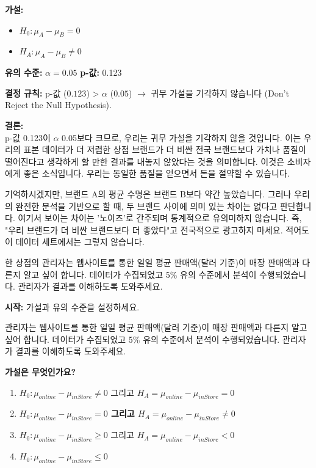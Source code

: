 \documentclass[11pt,a4paper]{article}
\begin{document}
\begin{tcolorbox}[mybox, title=두 브랜드 비교 (8/8): 4단계 - 귀무 가설 기각 여부 결정]
\textbf{가설:}
\begin{itemize}
    \item $H_0 : \mu_A - \mu_B = 0$
    \item $H_A : \mu_A - \mu_B \neq 0$
\end{itemize}
\textbf{유의 수준:} $\alpha = 0.05$
\textbf{p-값:} 0.123

\textbf{결정 규칙:}
p-값 ($0.123$) > $\alpha$ ($0.05$) $\rightarrow$ 귀무 가설을 기각하지 않습니다 (Don't Reject the Null Hypothesis).

\textbf{결론:} \\
p-값 0.123이 $\alpha$ 0.05보다 크므로, 우리는 귀무 가설을 기각하지 않을 것입니다.
이는 우리의 표본 데이터가 더 저렴한 상점 브랜드가 더 비싼 전국 브랜드보다 가치나 품질이 떨어진다고 생각하게 할 만한 결과를 내놓지 않았다는 것을 의미합니다. 이것은 소비자에게 좋은 소식입니다. 우리는 동일한 품질을 얻으면서 돈을 절약할 수 있습니다.

기억하시겠지만, 브랜드 A의 평균 수명은 브랜드 B보다 약간 높았습니다. 그러나 우리의 완전한 분석을 기반으로 할 때, 두 브랜드 사이에 의미 있는 차이는 없다고 판단합니다. 여기서 보이는 차이는 '노이즈'로 간주되며 통계적으로 유의미하지 않습니다. 즉, "우리 브랜드가 더 비싼 브랜드보다 더 좋았다"고 전국적으로 광고하지 마세요. 적어도 이 데이터 세트에서는 그렇지 않습니다.
\end{tcolorbox}

\begin{examplebox}[title=연습 문제: 온라인 vs. 매장 판매 - 문제 상황]
한 상점의 관리자는 웹사이트를 통한 일일 평균 판매액(달러 기준)이 매장 판매액과 다른지 알고 싶어 합니다. 데이터가 수집되었고 5\% 유의 수준에서 분석이 수행되었습니다. 관리자가 결과를 이해하도록 도와주세요.

\textbf{시작:} 가설과 유의 수준을 설정하세요.
\end{examplebox}

\begin{tcolorbox}[mybox, title=연습 문제: 가설은 무엇인가요? (선택)]
관리자는 웹사이트를 통한 일일 평균 판매액(달러 기준)이 매장 판매액과 다른지 알고 싶어 합니다. 데이터가 수집되었고 5\% 유의 수준에서 분석이 수행되었습니다. 관리자가 결과를 이해하도록 도와주세요.

\textbf{가설은 무엇인가요?}
\begin{enumerate}
    \item $H_0 : \mu_{online} - \mu_{inStore} \neq 0$ 그리고 $H_A = \mu_{online} - \mu_{inStore} = 0$
    \item \textbf{$H_0 : \mu_{online} - \mu_{inStore} = 0$ 그리고 $H_A = \mu_{online} - \mu_{inStore} \neq 0$}
    \item $H_0 : \mu_{online} - \mu_{inStore} \ge 0$ 그리고 $H_A = \mu_{online} - \mu_{inStore} < 0$
    \item $H_0 : \mu_{online} - \mu_{inStore} \le 0$
\end{enumerate}
\end{tcolorbox}
\end{document}
